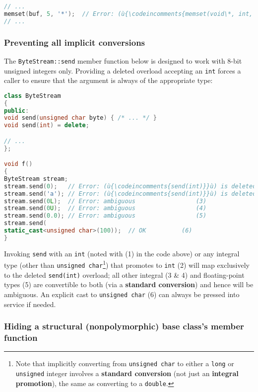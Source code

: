 \begin{lstlisting}[language=C++]
// ...
memset(buf, 5, '*');  // Error: (ù{\codeincomments{memset(void\*, int, char)}}ù) is deleted.
// ...
\end{lstlisting}


\subsubsection[Preventing all implicit conversions]{Preventing all implicit conversions}\label{preventing-all-implicit-conversions}

The \texttt{ByteStream::send} member function below is designed to work
with 8-bit unsigned integers only. Providing a deleted overload
accepting an \texttt{int} forces a caller to ensure that the argument is
always of the appropriate type:

\begin{lstlisting}[language=C++]
class ByteStream
{
public:
void send(unsigned char byte) { /* ... */ }
void send(int) = delete;

// ...
};

void f()
{
ByteStream stream;
stream.send(0);   // Error: (ù{\codeincomments{send(int)}}ù) is deleted.     (1)
stream.send('a'); // Error: (ù{\codeincomments{send(int)}}ù) is deleted.     (2)
stream.send(0L);  // Error: ambiguous                 (3)
stream.send(0U);  // Error: ambiguous                 (4)
stream.send(0.0); // Error: ambiguous                 (5)
stream.send(
static_cast<unsigned char>(100));  // OK          (6)
}
\end{lstlisting}

\noindent Invoking \texttt{send} with an \texttt{int} (noted with (1) in the code above) or any integral type
(other than \texttt{unsigned}~\texttt{char}{\cprotect\footnote{Note that
implicitly converting from \texttt{unsigned}~\texttt{char} to either a
\texttt{long} or \texttt{unsigned} integer involves a \textbf{standard
conversion} (not just an \textbf{integral promotion}), the same as
converting to a \texttt{double}.}}) that promotes to \texttt{int} (2)
will map exclusively to the deleted \texttt{send(int)} overload; all
other integral (3 \& 4) and floating-point types (5) are convertible to
both (via a \textbf{standard conversion}) and hence will be ambiguous.
An explicit cast to \texttt{unsigned}~\texttt{char} (6) can always be
pressed into service if needed.

\subsubsection[Hiding a structural (nonpolymorphic) base class's member function]{Hiding a structural (nonpolymorphic) base class’s member function}\label{hiding-a-structural-(nonpolymorphic)-base-class's-member-function}

